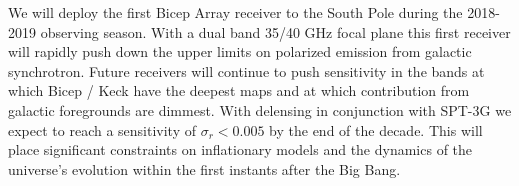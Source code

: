 \documentclass[12pt]{article}
\begin{document}
We will deploy the first Bicep Array receiver to the South Pole during the
2018-2019 observing season. With a dual band 35/40 GHz focal plane this first
receiver will rapidly push down the upper limits on polarized emission from
galactic synchrotron. Future receivers will continue to push sensitivity in the
bands at which Bicep / Keck have the deepest maps and at which contribution
from galactic foregrounds are dimmest. With delensing in conjunction with
SPT-3G we expect to reach a sensitivity of $\sigma _r < 0.005$ by the end of
the decade. This will place significant constraints on inflationary models and
the dynamics of the universe's evolution within the first instants after the
Big Bang.










\printbibliography
\end{document}
